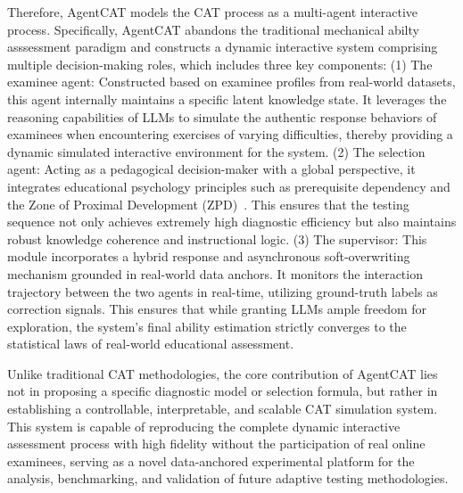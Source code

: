 Therefore, AgentCAT models the CAT process as a multi-agent interactive process. Specifically, AgentCAT abandons the traditional mechanical abilty asssessment paradigm and constructs a dynamic interactive system comprising multiple decision-making roles, which includes three key components:  (1) The examinee agent: Constructed based on examinee profiles from real-world datasets, this agent internally maintains a specific latent knowledge state. It leverages the reasoning capabilities of LLMs to simulate the authentic response behaviors of examinees when encountering exercises of varying difficulties, thereby providing a dynamic simulated interactive environment for the system. (2) The selection agent: Acting as a pedagogical decision-maker with a global perspective, it integrates educational psychology principles such as prerequisite dependency and the Zone of Proximal Development (ZPD)~\cite{cai2025exploring}. This ensures that the testing sequence not only achieves extremely high diagnostic efficiency but also maintains robust knowledge coherence and instructional logic. (3) The supervisor: This module incorporates a hybrid response and asynchronous soft-overwriting mechanism grounded in real-world data anchors. It monitors the interaction trajectory between the two agents in real-time, utilizing ground-truth labels as correction signals. This ensures that while granting LLMs ample freedom for exploration, the system's final ability estimation strictly converges to the statistical laws of real-world educational assessment.



Unlike traditional CAT methodologies, the core contribution of AgentCAT lies not in proposing a specific diagnostic model or selection formula, but rather in establishing a controllable, interpretable, and scalable CAT simulation system. This system is capable of reproducing the complete dynamic interactive assessment process with high fidelity without the participation of real online examinees, serving as a novel data-anchored experimental platform for the analysis, benchmarking, and validation of future adaptive testing methodologies.